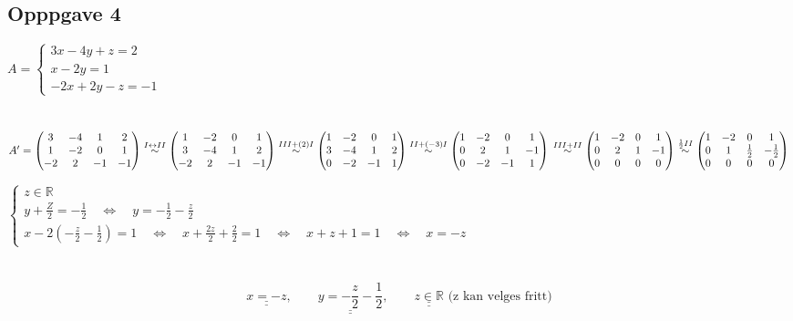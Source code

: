 \documentclass{article}
\newcommand{\uu}[1]{\underline{\underline{#1}}}
\newcommand{\eq}{\quad\Longleftrightarrow\quad}
\newcommand{\eqto}[1]{\overset{#1}{\sim}}
\begin{document}
\subsection*{Opppgave 4}
\(A = \begin{cases}
    3x-4y+z=2\\x-2y=1\\-2x+2y-z=-1
\end{cases}\)
\\ \\ \\
\(A' = \begin{pmatrix}
    3&-4&1&2\\1&-2&0&1\\-2&2&-1&-1
\end{pmatrix}
\eqto{I\leftrightarrow II}
\begin{pmatrix}
    1&-2&0&1\\3&-4&1&2\\-2&2&-1&-1
\end{pmatrix}
\eqto{III+(2)I}
\begin{pmatrix}
    1&-2&0&1\\3&-4&1&2\\0&-2&-1&1
\end{pmatrix}
\eqto{II+(-3)I}
\begin{pmatrix}
    1&-2&0&1\\0&2&1&-1\\0&-2&-1&1
\end{pmatrix} \\ \\ \\
\eqto{III+II}
\begin{pmatrix}
    1&-2&0&1\\0&2&1&-1\\0&0&0&0
\end{pmatrix}
\eqto{\frac{1}{2}II}
\begin{pmatrix}
    1&-2&0&1\\0&1&\frac{1}{2}&-\frac{1}{2}\\0&0&0&0
\end{pmatrix}
\)

\(\begin{cases}
    z \in \mathbb{R} \\
    y + \frac{Z}{2} = -\frac{1}{2} \eq y = -\frac{1}{2} - \frac{z}{2} \\
    x -2(-\frac{z}{2}-\frac{1}{2}) = 1 \eq x + \frac{2z}{2} + \frac{2}{2} = 1 \eq x + z + 1 = 1 \eq x = -z
\end{cases}\)
\\ \\ \\
\[\uu{x = -z}, \qquad \uu{y = -\frac{z}{2}-\frac{1}{2}}, \qquad \uu{z \in \mathbb{R}} \text{ (z kan velges fritt)}\]
\end{document}
